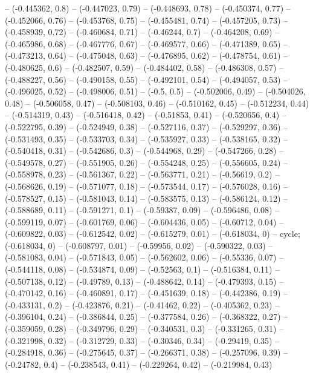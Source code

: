 -- (-0.445362, 0.8)
-- (-0.447023, 0.79)
-- (-0.448693, 0.78)
-- (-0.450374, 0.77)
-- (-0.452066, 0.76)
-- (-0.453768, 0.75)
-- (-0.455481, 0.74)
-- (-0.457205, 0.73)
-- (-0.458939, 0.72)
-- (-0.460684, 0.71)
-- (-0.46244, 0.7)
-- (-0.464208, 0.69)
-- (-0.465986, 0.68)
-- (-0.467776, 0.67)
-- (-0.469577, 0.66)
-- (-0.471389, 0.65)
-- (-0.473213, 0.64)
-- (-0.475048, 0.63)
-- (-0.476895, 0.62)
-- (-0.478754, 0.61)
-- (-0.480625, 0.6)
-- (-0.482507, 0.59)
-- (-0.484402, 0.58)
-- (-0.486308, 0.57)
-- (-0.488227, 0.56)
-- (-0.490158, 0.55)
-- (-0.492101, 0.54)
-- (-0.494057, 0.53)
-- (-0.496025, 0.52)
-- (-0.498006, 0.51)
-- (-0.5, 0.5)
-- (-0.502006, 0.49)
-- (-0.504026, 0.48)
-- (-0.506058, 0.47)
-- (-0.508103, 0.46)
-- (-0.510162, 0.45)
-- (-0.512234, 0.44)
-- (-0.514319, 0.43)
-- (-0.516418, 0.42)
-- (-0.51853, 0.41)
-- (-0.520656, 0.4)
-- (-0.522795, 0.39)
-- (-0.524949, 0.38)
-- (-0.527116, 0.37)
-- (-0.529297, 0.36)
-- (-0.531493, 0.35)
-- (-0.533703, 0.34)
-- (-0.535927, 0.33)
-- (-0.538165, 0.32)
-- (-0.540418, 0.31)
-- (-0.542686, 0.3)
-- (-0.544968, 0.29)
-- (-0.547266, 0.28)
-- (-0.549578, 0.27)
-- (-0.551905, 0.26)
-- (-0.554248, 0.25)
-- (-0.556605, 0.24)
-- (-0.558978, 0.23)
-- (-0.561367, 0.22)
-- (-0.563771, 0.21)
-- (-0.56619, 0.2)
-- (-0.568626, 0.19)
-- (-0.571077, 0.18)
-- (-0.573544, 0.17)
-- (-0.576028, 0.16)
-- (-0.578527, 0.15)
-- (-0.581043, 0.14)
-- (-0.583575, 0.13)
-- (-0.586124, 0.12)
-- (-0.588689, 0.11)
-- (-0.591271, 0.1)
-- (-0.59387, 0.09)
-- (-0.596486, 0.08)
-- (-0.599119, 0.07)
-- (-0.601769, 0.06)
-- (-0.604436, 0.05)
-- (-0.60712, 0.04)
-- (-0.609822, 0.03)
-- (-0.612542, 0.02)
-- (-0.615279, 0.01)
-- (-0.618034, 0)
-- cycle;
\drawBand (-0.618034, 0)
-- (-0.608797, 0.01)
-- (-0.59956, 0.02)
-- (-0.590322, 0.03)
-- (-0.581083, 0.04)
-- (-0.571843, 0.05)
-- (-0.562602, 0.06)
-- (-0.55336, 0.07)
-- (-0.544118, 0.08)
-- (-0.534874, 0.09)
-- (-0.52563, 0.1)
-- (-0.516384, 0.11)
-- (-0.507138, 0.12)
-- (-0.49789, 0.13)
-- (-0.488642, 0.14)
-- (-0.479393, 0.15)
-- (-0.470142, 0.16)
-- (-0.460891, 0.17)
-- (-0.451639, 0.18)
-- (-0.442386, 0.19)
-- (-0.433131, 0.2)
-- (-0.423876, 0.21)
-- (-0.41462, 0.22)
-- (-0.405362, 0.23)
-- (-0.396104, 0.24)
-- (-0.386844, 0.25)
-- (-0.377584, 0.26)
-- (-0.368322, 0.27)
-- (-0.359059, 0.28)
-- (-0.349796, 0.29)
-- (-0.340531, 0.3)
-- (-0.331265, 0.31)
-- (-0.321998, 0.32)
-- (-0.312729, 0.33)
-- (-0.30346, 0.34)
-- (-0.29419, 0.35)
-- (-0.284918, 0.36)
-- (-0.275645, 0.37)
-- (-0.266371, 0.38)
-- (-0.257096, 0.39)
-- (-0.24782, 0.4)
-- (-0.238543, 0.41)
-- (-0.229264, 0.42)
-- (-0.219984, 0.43)

